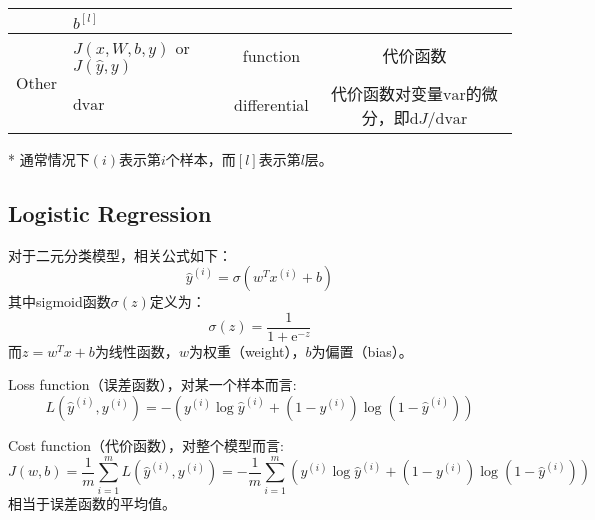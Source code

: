 \begin{table}[h]
\begin{threeparttable}
\begin{tabular}{clcc}
									 & $b^{[l]}$                           &                      &                                                                    \\ \hline
			\multirow{2}{*}{Other}   & $J(x,W,b,y)$ or $J(\hat{y},y)$      & function             & 代价函数                                                               \\
									 & $\mathrm{d}\mathrm{var}$            & differential         & 代价函数对变量$\mathrm{var}$的微分，即${\mathrm{d}J}/{\mathrm{d}\mathrm{var}}$ \\ \hline
		\end{tabular}
		\label{tab:notations} %
    	\begin{tablenotes}
      		\item[*] 通常情况下$(i)$表示第$i$个样本，而$[l]$表示第$l$层。
    	\end{tablenotes}
		\end{threeparttable}
	\end{table}

	\subsection{Logistic Regression}

	对于二元分类模型，相关公式如下：
	\begin{equation}
		\hat{y}^{(i)} = \sigma(w^T x^{(i)} + b) \label{eq:logistic}
	\end{equation}
	其中sigmoid函数$\sigma(z)$定义为：
	\begin{equation}
		\sigma(z) = \frac{1}{1 + \mathrm{e}^{-z}} \label{eq:sigmoid}
	\end{equation}
	而$z = w^T x + b$为线性函数，$w$为权重（weight），$b$为偏置（bias）。

	\vspace{0.5\baselineskip}
	Loss function（误差函数），对某一个样本而言:
	\begin{equation}
		L(\hat{y}^{(i)}, y^{(i)}) = -(y^{(i)} \log \hat{y}^{(i)} + (1 - y^{(i)}) \log (1 - \hat{y}^{(i)})) \label{eq:loss}
	\end{equation}

	Cost function（代价函数），对整个模型而言:
	\begin{equation}
		J(w, b) = \frac{1}{m} \sum_{i=1}^{m} L(\hat{y}^{(i)}, y^{(i)}) = -\frac{1}{m} \sum_{i=1}^{m} (y^{(i)} \log \hat{y}^{(i)} + (1 - y^{(i)}) \log (1 - \hat{y}^{(i)})) \label{eq:cost}
	\end{equation}
	相当于误差函数的平均值。

